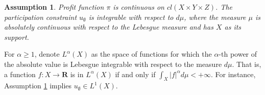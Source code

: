 \documentclass[a4paper, 11pt]{amsart}
\numberwithin{equation}{section}
\theoremstyle{plain}
\newtheorem{assumption}{Assumption}
\theoremstyle{definition}
\theoremstyle{remark}
\newcommand{\R}{\mathbf{R}}
\begin{document}
\begin{assumption}\label{assmp:Pi1}
	Profit function $\pi$ is continuous on $cl(X\times Y\times Z)$. The participation constraint $u_{\emptyset}$ is integrable with respect to $d \mu$, where the measure $\mu$ is absolutely continuous with respect to the Lebesgue measure and has $X$ as its support.
\end{assumption}





For $\alpha \ge 1$, denote $L^{\alpha}(X)$ as the space of functions for which the $\alpha$-th power of the absolute value is Lebesgue integrable {with respect to the measure $d \mu$}. That is, a function $f: X\longrightarrow \R$ is in $L^{\alpha}(X)$ if and only if $\int_{X} |f|^{\alpha} d\mu <+\infty$. For instance, Assumption \ref{assmp:Pi1} implies $u_{\emptyset}\in L^{1}(X)$.\medskip



 

 







\bigskip





\bigskip
\end{document}
